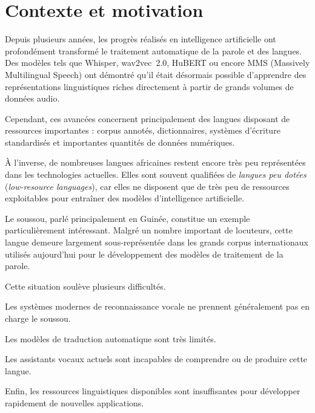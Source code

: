 \section{Contexte et motivation}

Depuis plusieurs années, les progrès réalisés en intelligence artificielle
ont profondément transformé le traitement automatique de la parole et des
langues. Des modèles tels que Whisper, wav2vec~2.0, HuBERT ou encore MMS
(Massively Multilingual Speech) ont démontré qu'il était désormais possible
d'apprendre des représentations linguistiques riches directement à partir
de grands volumes de données audio.

Cependant, ces avancées concernent principalement des langues disposant de
ressources importantes : corpus annotés, dictionnaires, systèmes
d'écriture standardisés et importantes quantités de données numériques.

À l'inverse, de nombreuses langues africaines restent encore très peu
représentées dans les technologies actuelles. Elles sont souvent qualifiées
de \emph{langues peu dotées} (\emph{low-resource languages}), car elles ne
disposent que de très peu de ressources exploitables pour entraîner des
modèles d'intelligence artificielle.

Le soussou, parlé principalement en Guinée, constitue un exemple
particulièrement intéressant. Malgré un nombre important de locuteurs,
cette langue demeure largement sous-représentée dans les grands corpus
internationaux utilisés aujourd'hui pour le développement des modèles de
traitement de la parole.

\vspace{0.5cm}

Cette situation soulève plusieurs difficultés.

Les systèmes modernes de reconnaissance vocale ne prennent généralement
pas en charge le soussou.

Les modèles de traduction automatique sont très limités.

Les assistants vocaux actuels sont incapables de comprendre ou de produire
cette langue.

Enfin, les ressources linguistiques disponibles sont insuffisantes pour
développer rapidement de nouvelles applications.

\vspace{0.5cm}

